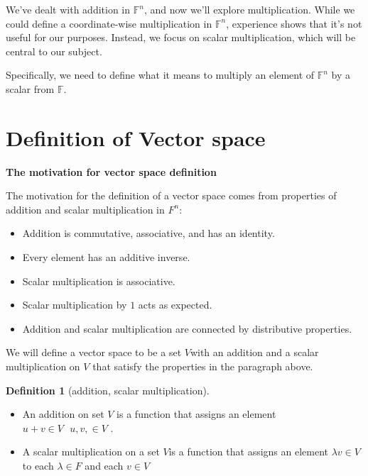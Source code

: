\documentclass[
]{book}
\providecommand{\tightlist}{%
  \setlength{\itemsep}{0pt}\setlength{\parskip}{0pt}}
\theoremstyle{definition}
\newtheorem{definition}{Definition}[chapter]
\theoremstyle{definition}
\theoremstyle{definition}
\theoremstyle{definition}
\theoremstyle{remark}
\begin{document}
We've dealt with addition in \(\mathbb{F}^n\), and now we'll explore multiplication. While we could define a coordinate-wise multiplication in \(\mathbb{F}^n\), experience shows that it's not useful for our purposes. Instead, we focus on scalar multiplication, which will be central to our subject.

Specifically, we need to define what it means to multiply an element of \(\mathbb{F}^n\) by a scalar from \(\mathbb{F}\).

\section{Definition of Vector space}\label{definition-of-vector-space}

\textbf{The motivation for vector space definition}

The motivation for the definition of a vector space comes from properties of addition and scalar multiplication in \(F^n\):

\begin{itemize}
\tightlist
\item
  Addition is commutative, associative, and has an identity.
\item
  Every element has an additive inverse.
\item
  Scalar multiplication is associative.
\item
  Scalar multiplication by \(1\) acts as expected.
\item
  Addition and scalar multiplication are connected by distributive properties.
\end{itemize}

We will define a vector space to be a set \(V\)with an addition and a scalar multiplication on \(V\) that satisfy the properties in the paragraph above.

\begin{definition}[addition, scalar multiplication]
\protect\hypertarget{def:unnamed-chunk-19}{}\label{def:unnamed-chunk-19}\leavevmode

\begin{itemize}
\tightlist
\item
  An addition on set \(V\) is a function that assigns an element \(u+v\in V ~~~ u,v,\in V\) .
\item
  A scalar multiplication on a set \(V\)is a function that assigns an element \(\lambda v \in V\) to each \(\lambda\in F\) and each \(v \in V\)
\end{itemize}

\end{definition}
\end{document}

